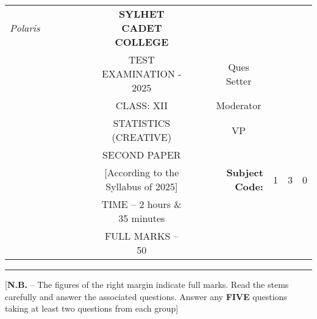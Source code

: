 \documentclass[12pt]{article}
\begin{document}
\begin{table}[]
\begin{tabular}{llllllcllrlll}
\textit{Polaris} &  &  &  &  &  & \textbf{SYLHET CADET COLLEGE}       &  &                       & \multicolumn{1}{l}{}                        &                        &                        &                        \\ \cline{10-13} 
                 &  &  &  &  &  & TEST EXAMINATION - 2025             &  & \multicolumn{1}{l|}{} & \multicolumn{1}{c|}{Ques Setter}            & \multicolumn{3}{l|}{}                                                    \\ \cline{10-13} 
                 &  &  &  &  &  & CLASS: XII                          &  & \multicolumn{1}{l|}{} & \multicolumn{1}{c|}{Moderator}              & \multicolumn{3}{l|}{}                                                    \\ \cline{10-13} 
                 &  &  &  &  &  & STATISTICS (CREATIVE)               &  & \multicolumn{1}{l|}{} & \multicolumn{1}{c|}{VP}                     & \multicolumn{3}{l|}{}                                                    \\ \cline{10-13} 
                 &  &  &  &  &  & SECOND PAPER                        &  &                       &                                             &                        &                        &                        \\ \cline{11-13} 
                 &  &  &  &  &  & [According to the Syllabus of 2025] &  &                       & \multicolumn{1}{r|}{\textbf{Subject Code:}} & \multicolumn{1}{l|}{1} & \multicolumn{1}{l|}{3} & \multicolumn{1}{l|}{0} \\ \cline{11-13} 
                 &  &  &  &  &  & TIME – 2 hours \& 35 minutes        &  &                       &                                             &                        &                        &                        \\
                 &  &  &  &  &  & FULL MARKS – 50                     &  &                       & \textbf{}                                   &                        &                        &                       
\end{tabular}
\end{table}

\hrule

\begin{center}
[\textbf{N.B.} – The figures of the right margin indicate full marks. Read the stems carefully and answer the associated questions. Answer any \textbf{FIVE} questions taking at least two questions from each group]\\
\end{center}
\end{document}
